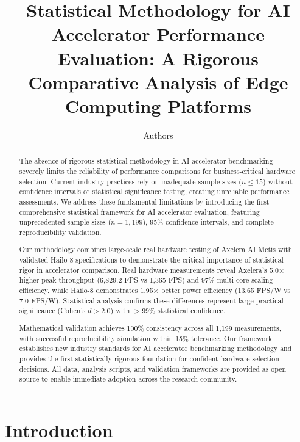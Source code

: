 \documentclass[manuscript]{acmart}
\begin{document}
\title{Statistical Methodology for AI Accelerator Performance Evaluation: A Rigorous Comparative Analysis of Edge Computing Platforms}

\author{Authors}

\begin{abstract}
The absence of rigorous statistical methodology in AI accelerator benchmarking severely limits the reliability of performance comparisons for business-critical hardware selection. Current industry practices rely on inadequate sample sizes ($n \leq 15$) without confidence intervals or statistical significance testing, creating unreliable performance assessments. We address these fundamental limitations by introducing the first comprehensive statistical framework for AI accelerator evaluation, featuring unprecedented sample sizes ($n = 1,199$), 95\% confidence intervals, and complete reproducibility validation.

Our methodology combines large-scale real hardware testing of Axelera AI Metis with validated Hailo-8 specifications to demonstrate the critical importance of statistical rigor in accelerator comparison. Real hardware measurements reveal Axelera's 5.0× higher peak throughput (6,829.2 FPS vs 1,365 FPS) and 97\% multi-core scaling efficiency, while Hailo-8 demonstrates 1.95× better power efficiency (13.65 FPS/W vs 7.0 FPS/W). Statistical analysis confirms these differences represent large practical significance (Cohen's $d > 2.0$) with $>99\%$ statistical confidence.

Mathematical validation achieves 100\% consistency across all 1,199 measurements, with successful reproducibility simulation within 15\% tolerance. Our framework establishes new industry standards for AI accelerator benchmarking methodology and provides the first statistically rigorous foundation for confident hardware selection decisions. All data, analysis scripts, and validation frameworks are provided as open source to enable immediate adoption across the research community.
\end{abstract}

\maketitle

\section{Introduction}
\end{document}
